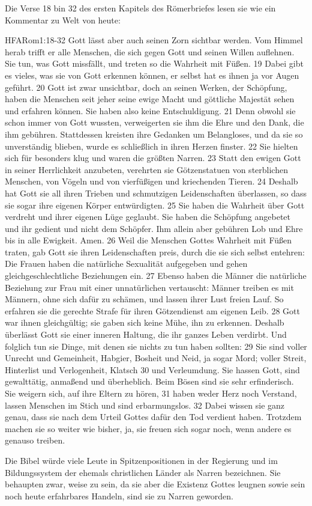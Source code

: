 \documentclass{../inc/mybib}
\begin{document}
Die Verse 18 bin 32 des ersten Kapitels des Römerbriefes lesen sie wie ein Kommentar zu Welt von heute:
\begin{bibeltext}{HFA}{Rom}{1:18-32}
    Gott lässt aber auch seinen Zorn sichtbar werden. Vom Himmel herab trifft er alle Menschen, die sich gegen Gott und seinen Willen auflehnen. Sie tun, was Gott missfällt, und treten so die Wahrheit mit Füßen. 19 Dabei gibt es vieles, was sie von Gott erkennen können, er selbst hat es ihnen ja vor Augen geführt. 20 Gott ist zwar unsichtbar, doch an seinen Werken, der Schöpfung, haben die Menschen seit jeher seine ewige Macht und göttliche Majestät sehen und erfahren können. Sie haben also keine Entschuldigung. 21 Denn obwohl sie schon immer von Gott wussten, verweigerten sie ihm die Ehre und den Dank, die ihm gebühren. Stattdessen kreisten ihre Gedanken um Belangloses, und da sie so unverständig blieben, wurde es schließlich in ihren Herzen finster. 22 Sie hielten sich für besonders klug und waren die größten Narren. 23 Statt den ewigen Gott in seiner Herrlichkeit anzubeten, verehrten sie Götzenstatuen von sterblichen Menschen, von Vögeln und von vierfüßigen und kriechenden Tieren. 24 Deshalb hat Gott sie all ihren Trieben und schmutzigen Leidenschaften überlassen, so dass sie sogar ihre eigenen Körper entwürdigten. 25 Sie haben die Wahrheit über Gott verdreht und ihrer eigenen Lüge geglaubt. Sie haben die Schöpfung angebetet und ihr gedient und nicht dem Schöpfer. Ihm allein aber gebühren Lob und Ehre bis in alle Ewigkeit. Amen. 26 Weil die Menschen Gottes Wahrheit mit Füßen traten, gab Gott sie ihren Leidenschaften preis, durch die sie sich selbst entehren: Die Frauen haben die natürliche Sexualität aufgegeben und gehen gleichgeschlechtliche Beziehungen ein. 27 Ebenso haben die Männer die natürliche Beziehung zur Frau mit einer unnatürlichen vertauscht: Männer treiben es mit Männern, ohne sich dafür zu schämen, und lassen ihrer Lust freien Lauf. So erfahren sie die gerechte Strafe für ihren Götzendienst am eigenen Leib. 28 Gott war ihnen gleichgültig; sie gaben sich keine Mühe, ihn zu erkennen. Deshalb überlässt Gott sie einer inneren Haltung, die ihr ganzes Leben verdirbt. Und folglich tun sie Dinge, mit denen sie nichts zu tun haben sollten: 29 Sie sind voller Unrecht und Gemeinheit, Habgier, Bosheit und Neid, ja sogar Mord; voller Streit, Hinterlist und Verlogenheit, Klatsch 30 und Verleumdung. Sie hassen Gott, sind gewalttätig, anmaßend und überheblich. Beim Bösen sind sie sehr erfinderisch. Sie weigern sich, auf ihre Eltern zu hören, 31 haben weder Herz noch Verstand, lassen Menschen im Stich und sind erbarmungslos. 32 Dabei wissen sie ganz genau, dass sie nach dem Urteil Gottes dafür den Tod verdient haben. Trotzdem machen sie so weiter wie bisher, ja, sie freuen sich sogar noch, wenn andere es genauso treiben.
\end{bibeltext}
Die Bibel würde viele Leute in Spitzenpositionen in der Regierung und im Bildungssystem der ehemals christlichen Länder als \flqq Narren\frqq{} bezeichnen. Sie behaupten zwar, weise zu sein, da sie aber die Existenz Gottes leugnen sowie sein noch heute erfahrbares Handeln, \flqq sind sie zu Narren geworden\frqq.
\end{document}
